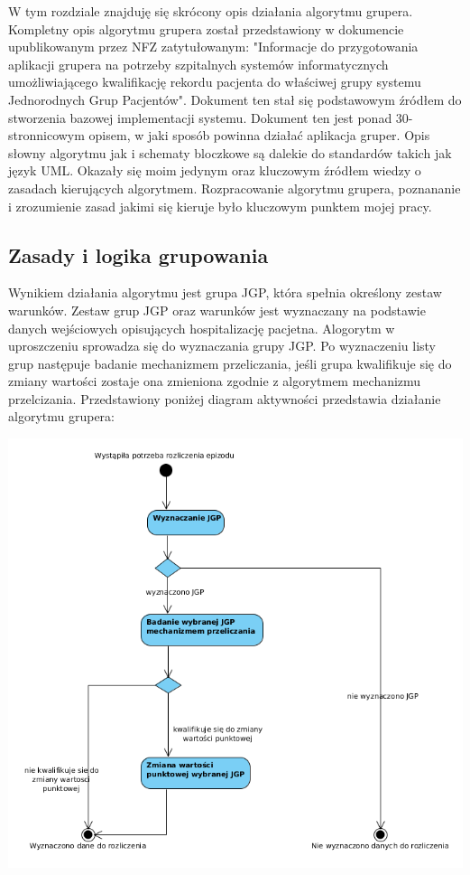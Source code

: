 W tym rozdziale znajduję się skrócony opis działania algorytmu grupera. Kompletny opis algorytmu grupera został przedstawiony w dokumencie upublikowanym przez NFZ zatytułowanym: "Informacje do przygotowania aplikacji grupera na potrzeby szpitalnych systemów informatycznych umożliwiającego kwalifikację rekordu pacjenta do właściwej grupy systemu Jednorodnych Grup Pacjentów". Dokument ten stał się podstawowym źródłem do stworzenia bazowej implementacji systemu. Dokument ten jest ponad 30-stronnicowym opisem, w jaki sposób powinna działać aplikacja gruper. Opis słowny algorytmu jak i schematy bloczkowe są dalekie do standardów takich jak język UML. Okazały się moim jedynym oraz kluczowym źródłem wiedzy o zasadach kierujących algorytmem. Rozpracowanie algorytmu grupera, poznananie i zrozumienie zasad jakimi się kieruje było kluczowym punktem mojej pracy.

\subsection{Zasady i logika grupowania}
\label{sec:zasadyLogikaGrupowania}
Wynikiem działania algorytmu jest grupa JGP, która spełnia określony zestaw warunków. Zestaw grup JGP oraz warunków jest wyznaczany na podstawie danych wejściowych opisujących hospitalizację pacjetna. Alogorytm w uproszczeniu sprowadza się do wyznaczania grupy JGP. Po wyznaczeniu listy grup następuje badanie mechanizmem przeliczania, jeśli grupa kwalifikuje się do zmiany wartości zostaje ona zmieniona zgodnie z algorytmem mechanizmu przelcizania. Przedstawiony poniżej diagram aktywności przedstawia działanie algorytmu grupera:

\includegraphics[scale=0.4]{images/activity-gruper}

